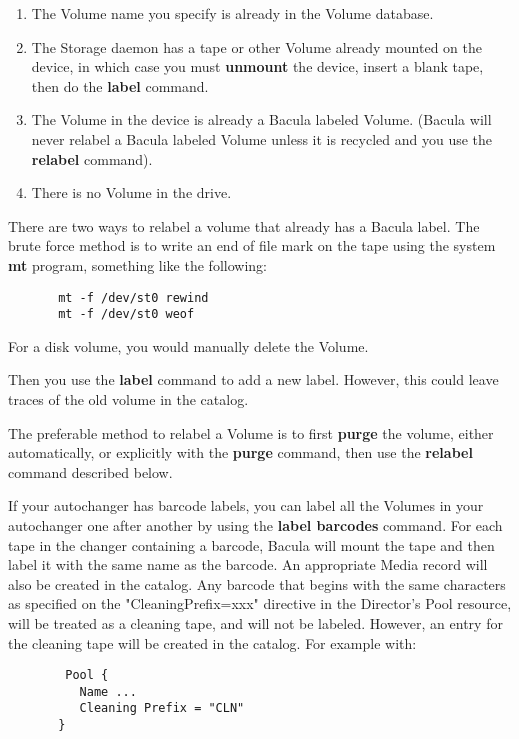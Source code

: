 \begin{description}
\begin{enumerate}
\item The Volume name you specify is already in the  Volume database.

\item The Storage daemon has a tape or other Volume already mounted on the
   device, in which case you must {\bf unmount} the device, insert a blank
   tape, then do the {\bf label} command.

\item The Volume in the device is already a Bacula labeled Volume.  (Bacula will
   never relabel a Bacula labeled Volume unless it is recycled and you use the
   {\bf relabel} command).

\item There is no Volume in the drive.
\end{enumerate}

There are two ways to relabel a volume that already has a Bacula label. The
brute  force method is to write an end of file mark on the tape  using the
system {\bf mt} program, something like the  following:

\footnotesize
\begin{verbatim}
       mt -f /dev/st0 rewind
       mt -f /dev/st0 weof
\end{verbatim}
\normalsize

For a disk volume, you would manually delete the Volume.

Then you use the {\bf label} command to add a new label.  However, this could
leave traces of the old volume in the  catalog.

The preferable method to relabel a Volume is to first {\bf purge}  the volume,
either automatically, or explicitly with the  {\bf purge} command, then use
the {\bf relabel} command described  below.

If your autochanger has barcode labels, you can label all the Volumes in
your autochanger one after another by using the {\bf label barcodes}
command.  For each tape in the changer containing a barcode, Bacula will
mount the tape and then label it with the same name as the barcode.  An
appropriate Media record will also be created in the catalog.  Any barcode
that begins with the same characters as specified on the
"CleaningPrefix=xxx" directive in the Director's Pool resource, will be
treated as a cleaning tape, and will not be labeled.  However, an entry for
the cleaning tape will be created in the catalog.  For example with:

\footnotesize
\begin{verbatim}
        Pool {
          Name ...
          Cleaning Prefix = "CLN"
       }


\end{verbatim}
\end{description}
